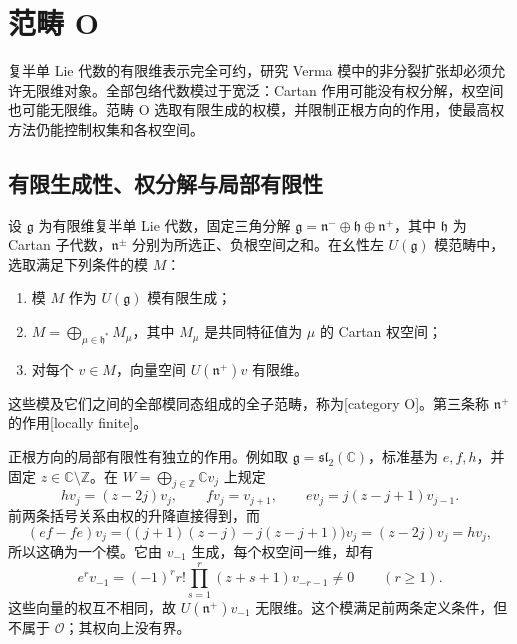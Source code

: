 
\section{范畴 O}
\label{b5:sec:2001}

%
%

复半单 Lie 代数的有限维表示完全可约，研究 Verma 模中的非分裂扩张却必须允许无限维对象。全部包络代数模过于宽泛：Cartan 作用可能没有权分解，权空间也可能无限维。范畴 O 选取有限生成的权模，并限制正根方向的作用，使最高权方法仍能控制权集和各权空间。

\subsection{有限生成性、权分解与局部有限性}
\label{b5:subsec:2001:01}

\begin{definition}\label{b5:def:category-o}
	设 \(\mathfrak g\) 为有限维复半单 Lie 代数，固定三角分解 \(\mathfrak g=\mathfrak n^-\oplus\mathfrak h\oplus\mathfrak n^+\)，其中 \(\mathfrak h\) 为 Cartan 子代数，\(\mathfrak n^\pm\) 分别为所选正、负根空间之和。在幺性左 \(U(\mathfrak g)\) 模范畴中，选取满足下列条件的模 \(M\)：
	\begin{enumerate}
		\item 模 \(M\) 作为 \(U(\mathfrak g)\) 模有限生成；
		\item \(M=\bigoplus_{\mu\in\mathfrak h^*}M_\mu\)，其中 \(M_\mu\) 是共同特征值为 \(\mu\) 的 Cartan 权空间；
		\item 对每个 \(v\in M\)，向量空间 \(U(\mathfrak n^+)v\) 有限维。
	\end{enumerate}
	这些模及它们之间的全部模同态组成的全子范畴，称为[category O]。第三条称 \(\mathfrak n^+\) 的作用[locally finite]。
\end{definition}

正根方向的局部有限性有独立的作用。例如取 \(\mathfrak g=\mathfrak{sl}_2(\mathbb C)\)，标准基为 \(e,f,h\)，并固定 \(z\in\mathbb C\setminus\mathbb Z\)。在 \(W=\bigoplus_{j\in\mathbb Z}\mathbb Cv_j\) 上规定
\[
	hv_j=(z-2j)v_j,\qquad fv_j=v_{j+1},\qquad ev_j=j(z-j+1)v_{j-1}.
\]
前两条括号关系由权的升降直接得到，而
\[
	(ef-fe)v_j=\bigl((j+1)(z-j)-j(z-j+1)\bigr)v_j =(z-2j)v_j=hv_j,
\]
所以这确为一个模。它由 \(v_{-1}\) 生成，每个权空间一维，却有
\[
	e^rv_{-1}=(-1)^r r!\prod_{s=1}^r(z+s+1)v_{-r-1}\ne0 \qquad(r\ge1).
\]
这些向量的权互不相同，故 \(U(\mathfrak n^+)v_{-1}\) 无限维。这个模满足前两条定义条件，但不属于 \(\mathcal O\)；其权向上没有界。

